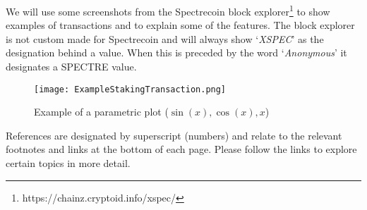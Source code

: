 We will use some screenshots from the Spectrecoin block
explorer\footnote{https://chainz.cryptoid.info/xspec/} to show examples of
transactions and to explain some of the features. The block explorer
is not custom made for Spectrecoin and will always show ‘\textit{XSPEC}’
as the designation behind a value. When this is preceded by the word
‘\textit{Anonymous}’ it designates a SPECTRE value.

\begin{figure}[ht]
	\caption{Example of a parametric plot ($\sin (x), \cos(x), x$)}
	\centering
	\texttt{[image: ExampleStakingTransaction.png]}
\end{figure}


References are designated by superscript (numbers) and relate to the relevant
footnotes and links at the bottom of each page. Please follow the links to
explore certain topics in more detail.
